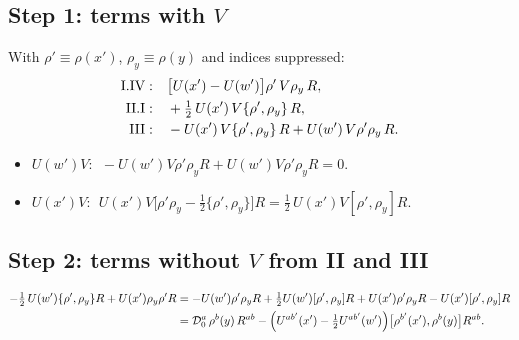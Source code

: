 \documentclass[10pt]{article}
\numberwithin{equation}{section}
\begin{document}
\subsection{Step 1: terms with $V$}
With $\rho'\equiv\rho(x')$, $\rho_{y}\equiv\rho(y)$ and indices suppressed:
\begin{align}
\text{I.IV}:&\quad\big[U(x')-U(w')\big]\rho'\,V\rho_{y}\,R,\notag\\
\text{II.I}:&\quad+\tfrac12\,U(x')\,V\{\rho',\rho_{y}\}\,R,\notag\\
\text{III}:&\quad-U(x')\,V\{\rho',\rho_{y}\}\,R+U(w')\,V\rho'\rho_{y}\,R.
\end{align}
\begin{itemize}
\item $U(w')V$: $\;-U(w')V\rho'\rho_{y}R+U(w')V\rho'\rho_{y}R=0$.
\item $U(x')V$: $\;U(x')V\big[\rho'\rho_{y}-\tfrac12\{\rho',\rho_{y}\}\big]R=\tfrac12\,U(x')V[\rho',\rho_{y}]R$.
\end{itemize}

\subsection{Step 2: terms without $V$ from II and III}
\begin{align}
-\tfrac12\,U(w')\{\rho',\rho_{y}\}R+U(x')\rho_{y}\rho'R
&=-U(w')\rho'\rho_{y}R+\tfrac12U(w')[\rho',\rho_{y}]R+U(x')\rho'\rho_{y}R-U(x')[\rho',\rho_{y}]R\notag\\
&=\mathcal{D}_{0}^{a}\,\rho^{b}(y)\,R^{ab}-\Big(U^{ab'}(x')-\tfrac12U^{ab'}(w')\Big)\big[\rho^{b'}(x'),\rho^{b}(y)\big]R^{ab}.
\end{align}
\end{document}
